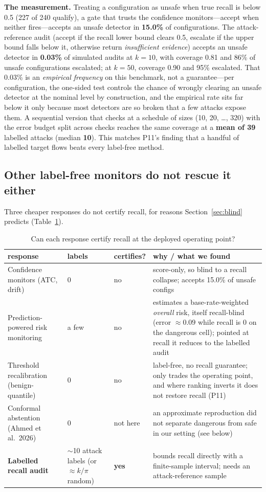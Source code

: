 \documentclass[11pt]{article}
\begin{document}
\textbf{The measurement.} Treating a configuration as unsafe when true recall is below 0.5 (227 of 240 qualify), a gate that trusts the confidence monitors---accept when neither fires---accepts an unsafe detector in \textbf{15.0\%} of configurations. The attack-reference audit (accept if the recall lower bound clears 0.5, escalate if the upper bound falls below it, otherwise return \emph{insufficient evidence}) accepts an unsafe detector in \textbf{0.03\%} of simulated audits at $k=10$, with coverage 0.81 and 86\% of unsafe configurations escalated; at $k=50$, coverage 0.90 and 95\% escalated. That 0.03\% is an \emph{empirical frequency} on this benchmark, not a guarantee---per configuration, the one-sided test controls the chance of wrongly clearing an unsafe detector at the nominal level by construction, and the empirical rate sits far below it only because most detectors are so broken that a few attacks expose them. A sequential version that checks at a schedule of sizes (10, 20, \dots, 320) with the error budget split across checks reaches the same coverage at a \textbf{mean of 39} labelled attacks (median \textbf{10}). This matches P11's finding that a handful of labelled target flows beats every label-free method.

\subsection{Other label-free monitors do not rescue it either}\label{sec:baselines}
Three cheaper responses do not certify recall, for reasons Section~\ref{sec:blind} predicts (Table~\ref{tab:2}).

\begin{table}[htbp]\centering\footnotesize
\caption{Can each response certify recall at the deployed operating point?}
\label{tab:2}
\begin{tabular}{p{3.6cm}p{2.1cm}p{1.6cm}p{5.4cm}}
\toprule
response & labels & certifies? & why / what we found \\
\midrule
Confidence monitors (ATC, drift) & 0 & no & score-only, so blind to a recall collapse; accepts 15.0\% of unsafe configs \\
Prediction-powered risk monitoring & a few & no & estimates a base-rate-weighted \emph{overall} risk, itself recall-blind (error $\approx 0.09$ while recall is 0 on the dangerous cell); pointed at recall it reduces to the labelled audit \\
Threshold recalibration (benign-quantile) & 0 & no & label-free, no recall guarantee; only trades the operating point, and where ranking inverts it does not restore recall (P11) \\
Conformal abstention (Ahmed et al.\ 2026) & 0 & not here & an approximate reproduction did not separate dangerous from safe in our setting (see below) \\
\textbf{Labelled recall audit} & $\sim$10 attack labels (or $\approx k/\pi$ random) & \textbf{yes} & bounds recall directly with a finite-sample interval; needs an attack-reference sample \\
\bottomrule
\end{tabular}
\end{table}
\end{document}
